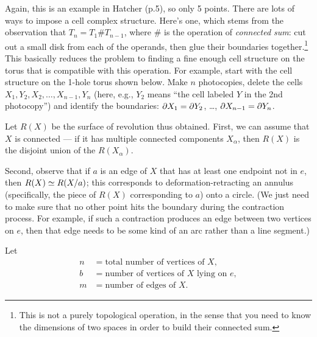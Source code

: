 
\soln Again, this is an example in Hatcher (p.5), so only 5 points.
There are lots of ways to impose a cell complex structure.  Here's one, which stems from the observation that $T_n=T_1\#T_{n-1}$,
where $\#$ is the operation of \emph{connected sum}: cut out a small disk from each of the operands,
then glue their boundaries together.\footnote{This is not a purely topological operation, in the sense that
you need to know the dimensions of two spaces in order to build their connected sum.}  This basically
reduces the problem to finding a fine enough cell structure on the torus that is compatible with this operation.
For example, start with the cell structure on the 1-hole torus shown below.  Make $n$ photocopies, delete the cells
$X_1,Y_2,X_2,\dots,X_{n-1},Y_n$ (here, e.g., $Y_2$ means ``the cell labeled $Y$ in the 2nd photocopy'')
and identify the boundaries: $\partial X_1=\partial Y_2$, \dots, $\partial X_{n-1}=\partial Y_n$.



\soln Let $R(X)$ be the surface of revolution thus obtained.
First, we can assume that $X$ is connected --- if it has multiple connected components $X_\alpha$,
then $R(X)$ is the disjoint union of the $R(X_\alpha)$.

Second, observe that if $a$ is an edge of $X$ that has at least one endpoint not in $e$,
then $R(X)\simeq R(X/a)$; this corresponds to deformation-retracting an annulus
(specifically, the piece of $R(X)$ corresponding to $a$) onto a circle.  (We just need to
make sure that no other point hits the boundary during the contraction process.  For example,
if such a contraction produces an edge between two vertices on $e$, then that edge needs to
be some kind of an arc rather than a line segment.)

Let
\begin{align*}
n &= \text{total number of vertices of $X$,}\\
b &= \text{number of vertices of $X$ lying on $e$},\\
m &= \text{number of edges of $X$.}
\end{align*}

